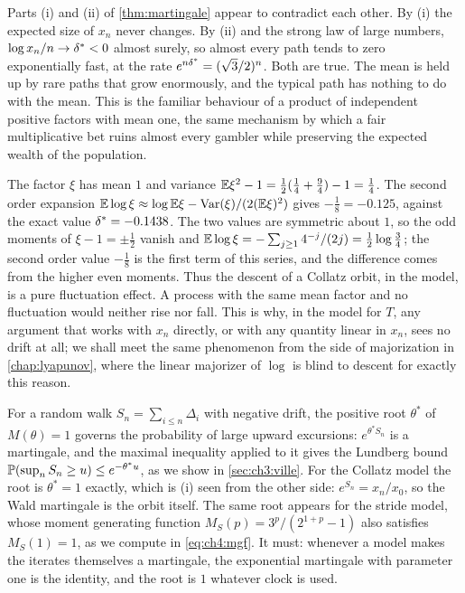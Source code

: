 Parts (i) and (ii) of \cref{thm:martingale} appear to contradict each other. By (i) the expected size of $x_n$ never
changes. By (ii) and the strong law of large numbers, $\log x_n/n\to\delta^{*}<0$
almost surely, so almost every path tends to zero exponentially fast, at the
rate $e^{n\delta^{*}}=(\sqrt3/2)^n$. Both are true. The mean is held up by rare paths
that grow enormously, and the typical path has nothing to do with the mean.
This is the familiar behaviour of a product of independent positive factors
with mean one, the same mechanism by which a fair multiplicative bet ruins
almost every gambler while preserving the expected wealth of the population.

\begin{remark}\label{rem:ch3:jensen}
The factor $\xi$ has mean $1$ and variance $\mathbb{E}\xi^2-1=\tfrac12(\tfrac14+\tfrac94)
-1=\tfrac14$. The second order expansion $\mathbb{E}\log\xi\approx\log\mathbb{E}\xi-
\operatorname{Var}(\xi)/(2(\mathbb{E}\xi)^2)$ gives $-\tfrac18=-0.125$, against the exact value
$\delta^{*}=-0.1438$.
The two values are symmetric about $1$, so the odd moments of $\xi-1=\pm\tfrac12$ vanish and $\mathbb{E}\log\xi=-\sum_{j\geq1}4^{-j}/(2j)=\tfrac12\log\tfrac34$; the second order value $-\tfrac18$ is the first term of this series, and the difference comes from the higher even moments.
Thus the descent of a Collatz orbit, in the model, is a pure fluctuation
effect. A process with the same mean factor and no fluctuation would neither
rise nor fall. This is why, in the model for $T$, any argument that works with $x_n$ directly, or with
any quantity linear in $x_n$, sees no drift at all; we shall meet the same phenomenon
from the side of majorization in \cref{chap:lyapunov}, where the linear
majorizer of $\log$ is blind to descent for exactly this reason.
\end{remark}

For a random walk $S_n=\sum_{i\le n}\Delta_i$
with negative drift, the positive root $\theta^*$ of $M(\theta)=1$ governs the
probability of large upward excursions: $e^{\theta^*S_n}$ is a martingale, and
the maximal inequality applied to it gives the Lundberg bound
$\mathbb{P}(\sup_nS_n\geq u)\le e^{-\theta^*u}$, as we show in
\cref{sec:ch3:ville}. For the Collatz model the root is $\theta^*=1$ exactly,
which is (i) seen from the other side: $e^{S_n}=x_n/x_0$, so the Wald
martingale is the orbit itself. The same root appears for the stride model,
whose moment generating function $M_S(p)=3^p/(2^{1+p}-1)$ also satisfies
$M_S(1)=1$, as we compute in \eqref{eq:ch4:mgf}. It must: whenever a model makes
the iterates themselves a martingale, the exponential martingale with
parameter one is the identity, and the root is $1$ whatever clock is used.

